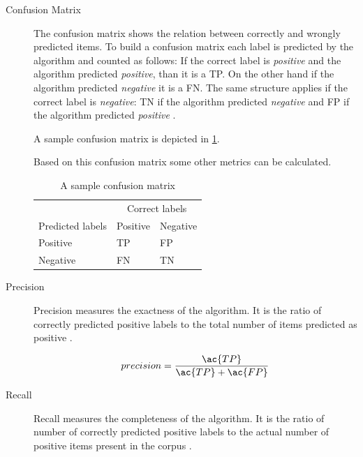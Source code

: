 \begin{description}
	\item [Confusion Matrix]
		The confusion matrix shows the relation between correctly and wrongly predicted items.
		To build a confusion matrix each label is predicted by the algorithm and counted as follows:
		If the correct label is \emph{positive} and the algorithm predicted \emph{positive}, than it is a \ac{TP}.
		On the other hand if the algorithm predicted \emph{negative} it is a \ac{FN}.
		The same structure applies if the correct label is \emph{negative}: \ac{TN} if the algorithm predicted \emph{negative} and \ac{FP} if the algorithm predicted \emph{positive}
		\cite{Tripathy2015}.

		A sample confusion matrix is depicted in \cref{tab:background-optionmining-confusionmatrix}.

		Based on this confusion matrix some other metrics can be calculated.
		
		\begin{table}
			\begin{center}
				\begin{tabular}{l | l l}
					 & \multicolumn{2}{c}{Correct labels} \\
					Predicted labels & Positive & Negative \\ \hline
					Positive & \ac{TP} & \ac{FP} \\
					Negative & \ac{FN} & \ac{TN} \\ \hline					
				\end{tabular}
		
				\caption{A sample confusion matrix}
				\label{tab:background-optionmining-confusionmatrix}
			\end{center}
		\end{table}

	\item [Precision]
		Precision measures the exactness of the algorithm.
		It is the ratio of correctly predicted positive labels to the total number of items predicted as positive
		\cite{Tripathy2015}.

		\begin{equation}
			precision = \frac{\ac{TP}}{\ac{TP}+\ac{FP}}
			\label{eq:background-optionmining-metrics-precision}
		\end{equation}

	\item [Recall]
		Recall measures the completeness of the algorithm.
		It is the ratio of number of correctly predicted positive labels to the actual number of positive items present in the corpus
		\cite{Tripathy2015}.


\end{description}
